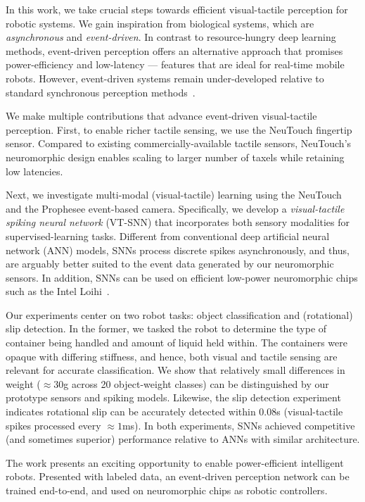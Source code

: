\documentclass[fyp]{socreport}
\begin{document}
In this work, we take crucial steps towards efficient visual-tactile perception
for robotic systems. We gain inspiration from biological systems, which are
\emph{asynchronous} and \emph{event-driven}. In contrast to resource-hungry deep
learning methods, event-driven perception offers an alternative approach that
promises power-efficiency and low-latency --- features that are ideal for
real-time mobile robots. However, event-driven systems remain under-developed
relative to standard synchronous perception methods~\cite{pfeiffer2018deep}.

We make multiple contributions that advance event-driven visual-tactile
perception. First, to enable richer tactile sensing, we use the NeuTouch
fingertip sensor. Compared to existing commercially-available tactile sensors,
NeuTouch's neuromorphic design enables scaling to larger number of taxels while
retaining low latencies.

Next, we investigate multi-modal (visual-tactile) learning using the NeuTouch
and the Prophesee event-based camera. Specifically, we develop a
\emph{visual-tactile spiking neural network} (VT-SNN) that incorporates both
sensory modalities for supervised-learning tasks. Different from conventional
deep artificial neural network (ANN) models, SNNs process discrete spikes
asynchronously, and thus, are arguably better suited to the event data generated
by our neuromorphic sensors. In addition, SNNs can be used on efficient
low-power neuromorphic chips such as the Intel Loihi~\cite{davies2018loihi}.

Our experiments center on two robot tasks: object classification and
(rotational) slip detection. In the former, we tasked the robot to determine the
type of container being handled and amount of liquid held within. The containers
were opaque with differing stiffness, and hence, both visual and tactile sensing
are relevant for accurate classification. We show that relatively small
differences in weight ($\approx 30$g across 20 object-weight classes) can be
distinguished by our prototype sensors and spiking models. Likewise, the slip
detection experiment indicates rotational slip can be accurately detected within
$0.08$s (visual-tactile spikes processed every $\approx 1$ms). In both
experiments, SNNs achieved competitive (and sometimes superior) performance
relative to ANNs with similar architecture.

The work presents an exciting opportunity to enable power-efficient intelligent
robots. Presented with labeled data, an event-driven perception network can be
trained end-to-end, and used on neuromorphic chips as robotic controllers.
\end{document}
